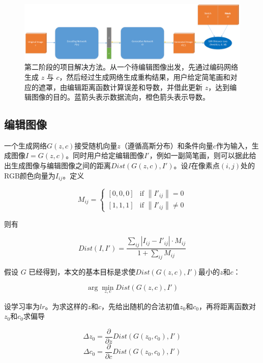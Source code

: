 \documentclass[a4paper,12pt,UTF8]{ctexart}
\newcommand{\norm}[1]{\left\lVert#1\right\rVert}
\newcommand{\kai}{\CJKfamily{zhkai}}	%
\begin{document}
\begin{figure}[H]
  \centering
  \includegraphics[width=1\linewidth]{figs/workflow2.png}
  \caption{\kai 第二阶段的项目解决方法。从一个待编辑图像出发，先通过编码网络生成 $z$ 与 $c$，然后经过生成网络生成重构结果，用户给定简笔画和对应的遮罩，由编辑距离函数计算误差和导数，并借此更新 $z$，达到编辑图像的目的。蓝箭头表示数据流向，橙色箭头表示导数。}
  \label{fig:workflow2}
\end{figure}

\subsection{编辑图像}

一个生成网络$G(z, c)$接受随机向量$z$（遵循高斯分布）和条件向量$c$作为输入，生成图像$I = G(z, c)$。同时用户给定编辑图像$I'$，例如一副简笔画，则可以据此给出生成图像与编辑图像之间的距离$Dist(G(z, c), I')$。设$I$在像素点$(i, j)$处的RGB颜色向量为$I_{ij}$。定义

\begin{equation}
  M_{ij} =
  \begin{cases}
    [0, 0, 0]   &  \text{if $\norm{I'_{ij}} = 0$} \\
    [1, 1, 1]   &  \text{if $\norm{I'_{ij}} \neq 0$}
  \end{cases}
\end{equation}

则有

\begin{equation}
  Dist(I, I') = \frac{\sum_{ij} |I_{ij} - I'_{ij}| \cdot M_{ij}}{1 + \sum_{ij} M_{ij}}
\end{equation}

假设 $G$ 已经得到，本文的基本目标是求使$Dist(G(z, c), I')$最小的$z$和$c$：

\begin{equation}
  \arg\min_{z, c} Dist(G(z, c), I')
\end{equation}

设学习率为$lr$。为求这样的$z$和$c$，先给出随机的合法初值$z_{0}$和$c_{0}$，再将距离函数对$z_{0}$和$c_{0}$求偏导

\begin{equation}
  \Delta z_{0} = \frac{\partial}{\partial z} Dist(G(z_{0}, c_{0}), I')
\end{equation}
\begin{equation}
  \Delta c_{0} = \frac{\partial}{\partial c} Dist(G(z_{0}, c_{0}), I')
\end{equation}
\end{document}
